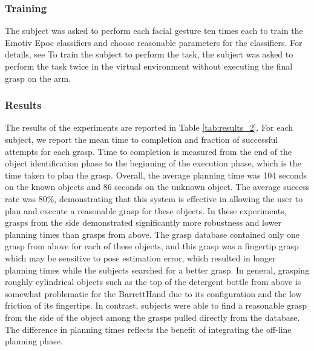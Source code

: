 \subsubsection{Training}
\label{sec:emotiv_training}
The subject was asked to perform each facial gesture ten times each to train the Emotiv Epoc classifiers and choose reasonable parameters for the classifiers. For details, see \cite{Weisz2013} To train the subject to perform the task, the subject was asked to perform the task twice in the virtual environment without executing the final grasp on the arm. 

\subsubsection{Results}
The results of the experiments are reported in Table \ref{tab:results_2}. For each subject, we report the mean time to completion and fraction of successful attempts for each grasp. Time to completion is measured from the end of the object identification phase to the beginning of the execution phase, which is the time taken to plan the grasp. Overall, the average planning time was 104 seconds on the known objects and 86 seconds on the unknown object. The average success rate was 80\%, demonstrating that this system is effective in allowing the user to plan and execute a reasonable grasp for these objects.
In these experiments, grasps from the side demonstrated significantly more robustness and lower planning times than grasps from above. The grasp database contained only one grasp from above for each of these objects, and this grasp was a fingertip grasp which may be sensitive to pose estimation error, which resulted in longer planning times while the subjects searched for a better grasp. In general, grasping roughly cylindrical objects such as the top of the detergent bottle from above is somewhat problematic for the BarrettHand due to its configuration and the low friction of its fingertips. In contrast, subjects were able to find a reasonable grasp from the side of the object among the grasps pulled directly from the database. The difference in planning times reflects the benefit of integrating the off-line planning phase.

